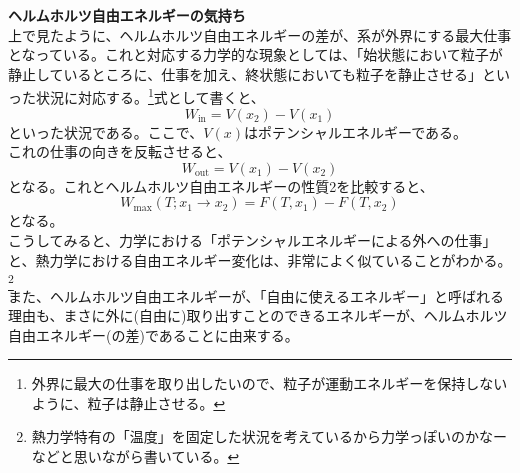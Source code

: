 \documentclass[a4paper,11pt]{jsarticle}
\numberwithin{equation}{section}
\begin{document}
\textbf{ヘルムホルツ自由エネルギーの気持ち}\\
上で見たように、ヘルムホルツ自由エネルギーの差が、系が外界にする最大仕事となっている。これと対応する力学的な現象としては、「始状態において粒子が静止しているところに、仕事を加え、終状態においても粒子を静止させる」といった状況に対応する。\footnote{外界に最大の仕事を取り出したいので、粒子が運動エネルギーを保持しないように、粒子は静止させる。}式として書くと、
\begin{equation}
    W_{\text{in}} = V(x_2)-V(x_1)
\end{equation}
といった状況である。ここで、$V(x)$はポテンシャルエネルギーである。\\
これの仕事の向きを反転させると、
\begin{equation}
    W_{\text{out}} = V(x_1)-V(x_2)
\end{equation}
となる。これとヘルムホルツ自由エネルギーの性質2を比較すると、
\begin{equation}
    W_{\text{max}}(T;x_1\rightarrow x_2) = F(T,x_1)-F(T,x_2)
\end{equation}
となる。\\
こうしてみると、力学における「ポテンシャルエネルギーによる外への仕事」と、熱力学における自由エネルギー変化は、非常によく似ていることがわかる。\footnote{熱力学特有の「温度」を固定した状況を考えているから力学っぽいのかなーなどと思いながら書いている。}\\
また、ヘルムホルツ自由エネルギーが、「自由に使えるエネルギー」と呼ばれる理由も、まさに外に(自由に)取り出すことのできるエネルギーが、ヘルムホルツ自由エネルギー(の差)であることに由来する。\\
\end{document}
